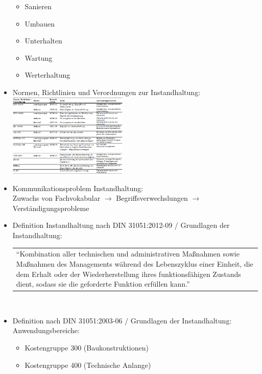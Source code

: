 \documentclass[fleqn,twoside,dvipsnames]{article}
\begin{document}
\begin{itemize}
\begin{itemize}
                    \item Sanieren
                    \item Umbauen
                    \item Unterhalten
                    \item Wartung
                    \item Werterhaltung
                \end{itemize}
            \item Normen, Richtlinien und Verordnungen zur Instandhaltung:\\
                    \includegraphics[width=0.45\textwidth]{Grafiken/Instandhaltung/Normen Uebersicht.png}
            \item Kommunikationsproblem Instandhaltung:\\
                    Zuwachs von Fachvokabular $\rightarrow$ Begriffsverwechslungen $\rightarrow$ Verständigungsprobleme
            \item Definition Instandhaltung nach DIN 31051:2012-09 / Grundlagen der Instandhaltung:\\
                    \begin{tabular}{|p{13cm}}\enquote{Kombination aller technischen und administrativen Maßnahmen sowie Maßnahmen des Managements während des Lebenszyklus einer Einheit, die dem Erhalt oder der Wiederherstellung ihres funktionsfähigen Zustands dient, sodass sie die geforderte Funktion erfüllen kann.} \end{tabular}\vspace{1.5mm}\\
            \item Definition nach DIN 31051:2003-06 / Grundlagen der Instandhaltung: \label{DIN31051}\\
                    Anwendungsbereiche: 
                        \begin{itemize}
                            \item Kostengruppe 300 (Baukonstruktionen)
                            \item Kostengruppe 400 (Technische Anlange)
                        \end{itemize}
                        

\end{itemize}
\end{document}
